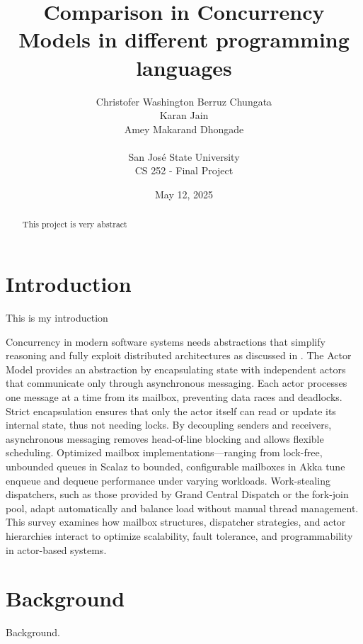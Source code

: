 \documentclass[12pt]{article}
\begin{document}
\title{Comparison in Concurrency Models in different programming languages}
\author{
    Christofer Washington Berruz Chungata \\ 
    Karan Jain \\ 
    Amey Makarand Dhongade \\ 
    \\
    San Jos\'{e} State University \\ 
    CS 252 - Final Project
}
\date{May 12, 2025}

\maketitle

\begin{abstract}
This project is very abstract
\end{abstract}

\section{Introduction\label{sec:introduction}}
This is my introduction

Concurrency in modern software systems needs abstractions
that simplify reasoning and fully exploit distributed
architectures as discussed in \cite{10.1145/357980.358021}.
The Actor Model provides an abstraction by encapsulating state
with independent actors that communicate only through
asynchronous messaging. Each actor processes one message
at a time from its mailbox, preventing data races and deadlocks.
Strict encapsulation ensures that only the actor itself can read
or update its internal state, thus not  needing locks.
By decoupling senders and receivers, asynchronous messaging
removes head-of-line blocking and allows flexible scheduling.
Optimized mailbox implementations—ranging from lock-free,
unbounded queues in Scalaz to bounded,
configurable mailboxes in Akka tune enqueue and dequeue
performance under varying workloads. Work-stealing dispatchers,
such as those provided by Grand Central Dispatch or the fork-join pool,
adapt automatically and balance load without manual thread management.
This survey examines how mailbox structures, dispatcher strategies,
and actor hierarchies interact to optimize scalability, fault tolerance,
and programmability in actor-based systems.

\section{Background\label{sec:background}}
Background.







\end{document}
